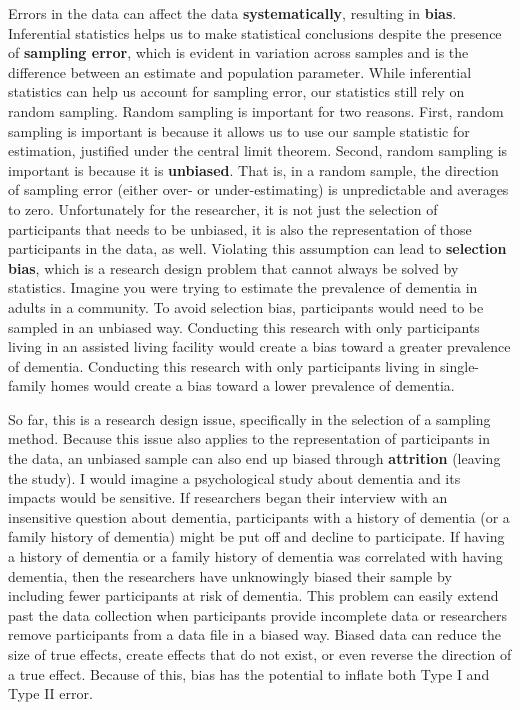 \documentclass[
]{book}
\begin{document}
\begin{enumerate}
  Errors in the data can affect the data \textbf{systematically}, resulting in \textbf{bias}. Inferential statistics helps us to make statistical conclusions despite the presence of \textbf{sampling error}, which is evident in variation across samples and is the difference between an estimate and population parameter. While inferential statistics can help us account for sampling error, our statistics still rely on random sampling. Random sampling is important for two reasons. First, random sampling is important is because it allows us to use our sample statistic for estimation, justified under the central limit theorem. Second, random sampling is important is because it is \textbf{unbiased}. That is, in a random sample, the direction of sampling error (either over- or under-estimating) is unpredictable and averages to zero. Unfortunately for the researcher, it is not just the selection of participants that needs to be unbiased, it is also the representation of those participants in the data, as well. Violating this assumption can lead to \textbf{selection bias}, which is a research design problem that cannot always be solved by statistics. Imagine you were trying to estimate the prevalence of dementia in adults in a community. To avoid selection bias, participants would need to be sampled in an unbiased way. Conducting this research with only participants living in an assisted living facility would create a bias toward a greater prevalence of dementia. Conducting this research with only participants living in single-family homes would create a bias toward a lower prevalence of dementia.
\end{enumerate}

So far, this is a research design issue, specifically in the selection of a sampling method. Because this issue also applies to the representation of participants in the data, an unbiased sample can also end up biased through \textbf{attrition} (leaving the study). I would imagine a psychological study about dementia and its impacts would be sensitive. If researchers began their interview with an insensitive question about dementia, participants with a history of dementia (or a family history of dementia) might be put off and decline to participate. If having a history of dementia or a family history of dementia was correlated with having dementia, then the researchers have unknowingly biased their sample by including fewer participants at risk of dementia. This problem can easily extend past the data collection when participants provide incomplete data or researchers remove participants from a data file in a biased way. Biased data can reduce the size of true effects, create effects that do not exist, or even reverse the direction of a true effect. Because of this, bias has the potential to inflate both Type I and Type II error.
\end{document}
